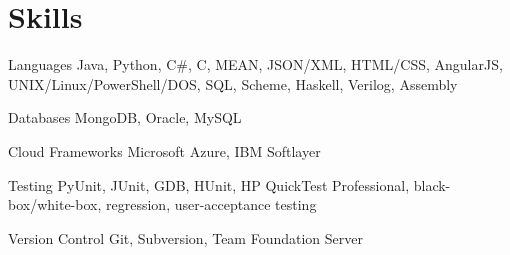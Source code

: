 \documentclass[fontsize=10pt]{tccv}
\begin{document}
	\section{Skills}
	
	\begin{factlist}
		
		\item{Languages}
		{Java, Python, C\#, C, MEAN, JSON/XML, HTML/CSS, AngularJS, UNIX/Linux/PowerShell/DOS, SQL, Scheme, Haskell, Verilog, Assembly}
		
		\item{Databases}
		{MongoDB, Oracle, MySQL}
		
		\item{Cloud Frameworks}
		{Microsoft Azure, IBM Softlayer}
		
		\item {Testing}
		{PyUnit, JUnit, GDB, HUnit, HP QuickTest Professional, black-box/white-box, regression, user-acceptance testing}
		
		\item{Version Control}
		{Git, Subversion, Team Foundation Server}
		
	\end{factlist}
	
\end{document}
